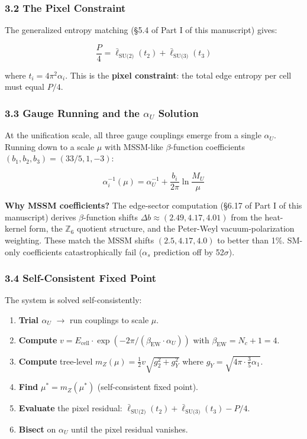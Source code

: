 \subsubsection{3.2 The Pixel Constraint}\label{32-the-pixel-constraint}

The generalized entropy matching (§5.4 of Part I of this manuscript) gives:

\[\frac{P}{4} = \bar{\ell}_{\text{SU(2)}}(t_2) + \bar{\ell}_{\text{SU(3)}}(t_3)\]

where \(t_i = 4\pi^2 \alpha_i\). This is the \textbf{pixel constraint}: the total edge entropy per cell must equal \(P/4\).

\subsubsection{\texorpdfstring{3.3 Gauge Running and the \(\alpha_U\) Solution}{3.3 Gauge Running and the \textbackslash alpha\_U Solution}}\label{33-gauge-running-and-the-alpha_u-solution}

At the unification scale, all three gauge couplings emerge from a single \(\alpha_U\). Running down to a scale \(\mu\) with MSSM-like \(\beta\)-function coefficients \((b_1, b_2, b_3) = (33/5, 1, -3)\):

\[\alpha_i^{-1}(\mu) = \alpha_U^{-1} + \frac{b_i}{2\pi} \ln\frac{M_U}{\mu}\]

\textbf{Why MSSM coefficients?} The edge-sector computation (§6.17 of Part I of this manuscript) derives \(\beta\)-function shifts \(\Delta b \approx (2.49, 4.17, 4.01)\) from the heat-kernel form, the \(\mathbb{Z}_6\) quotient structure, and the Peter-Weyl vacuum-polarization weighting. These match the MSSM shifts \((2.5, 4.17, 4.0)\) to better than 1\%. SM-only coefficients catastrophically fail (\(\alpha_s\) prediction off by 52\(\sigma\)).

\subsubsection{3.4 Self-Consistent Fixed Point}\label{34-self-consistent-fixed-point}

The system is solved self-consistently:

\begin{enumerate}
\def\labelenumi{\arabic{enumi}.}
\tightlist
\item
  \textbf{Trial \(\alpha_U\)} \(\rightarrow\) run couplings to scale \(\mu\).
\item
  \textbf{Compute} \(v = E_{\text{cell}} \cdot \exp(-2\pi/(\beta_{\text{EW}} \cdot \alpha_U))\) with \(\beta_{\text{EW}} = N_c + 1 = 4\).
\item
  \textbf{Compute} tree-level \(m_Z(\mu) = \frac{1}{2} v \sqrt{g_2^2 + g_Y^2}\) where \(g_Y = \sqrt{4\pi \cdot \frac{3}{5}\alpha_1}\).
\item
  \textbf{Find} \(\mu^* = m_Z(\mu^*)\) (self-consistent fixed point).
\item
  \textbf{Evaluate} the pixel residual: \(\bar{\ell}_{\text{SU(2)}}(t_2) + \bar{\ell}_{\text{SU(3)}}(t_3) - P/4\).
\item
  \textbf{Bisect} on \(\alpha_U\) until the pixel residual vanishes.
\end{enumerate}

